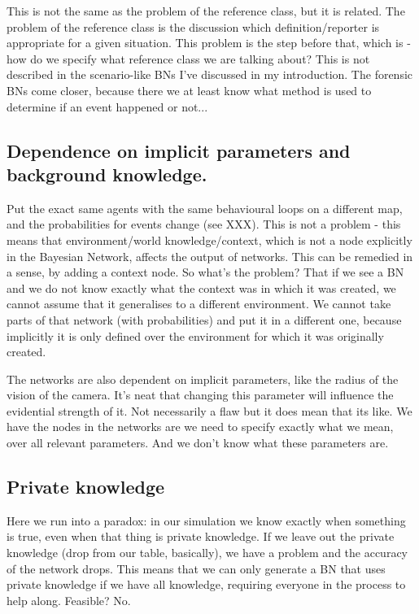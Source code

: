 This is not the same as the problem of the reference class, but it is related. The problem of the reference class is the discussion which definition/reporter is appropriate for a given situation. This problem is the step before that, which is - how do we specify what reference class we are talking about? This is not described in the scenario-like BNs I've discussed in my introduction. The forensic BNs come closer, because there we at least know what method is used to determine if an event happened or not...

\subsection{Dependence on implicit parameters and background knowledge.}

Put the exact same agents with the same behavioural loops on a different map, and the probabilities for events change (see XXX). This is not a problem - this means that environment/world knowledge/context, which is not a node explicitly in the Bayesian Network, affects the output of networks. This can be remedied in a sense, by adding a context node. So what's the problem? That if we see a BN and we do not know exactly what the context was in which it was created, we cannot assume that it generalises to a different environment. We cannot take parts of that network (with probabilities) and put it in a different one, because implicitly it is only defined over the environment for which it was originally created.

The networks are also dependent on implicit parameters, like the radius of the vision of the camera. It's neat that changing this parameter will influence the evidential strength of it. Not necessarily a flaw but it does mean that its like. We have the nodes in the networks are we need to specify exactly what we mean, over all relevant parameters. And we don't know what these parameters are.

\subsection{Private knowledge}

Here we run into a paradox: in our simulation we know exactly when something is true, even when that thing is private knowledge. If we leave out the private knowledge (drop from our table, basically), we have a problem and the accuracy of the network drops. This means that we can only generate a BN that uses private knowledge if we have all knowledge, requiring everyone in the process to help along. Feasible? No.


